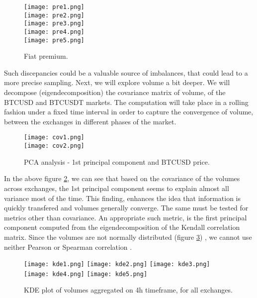 \begin{figure}[H]
	\centering
    \texttt{[image: pre1.png]} \\
    \texttt{[image: pre2.png]} \\
    \texttt{[image: pre3.png]} \\
    \texttt{[image: pre4.png]} \\
    \texttt{[image: pre5.png]} \\
	\caption{Fiat premium.}
    \label{fig:premium}
\end{figure}


Such discepancies could be a valuable source of imbalances, that could lead to a more precise sampling. Next, we will explore volume a bit deeper. We will decompose (eigendecomposition) the covariance matrix of volume, of the BTCUSD and BTCUSDT markets. The computation will take place in a rolling fashion under a fixed time interval in order to capture the convergence of volume, between the exchanges in different phases of the market.


\begin{figure}[H]
	\centering
    \texttt{[image: cov1.png]} \\
    \texttt{[image: cov2.png]} \\
	\caption{PCA analysis - 1st principal component and BTCUSD price.}
    \label{fig:covmatrix}
\end{figure}

In the above figure \ref{fig:covmatrix}, we can see that based on the covariance of the volumes across exchanges, the 1st principal component seems to explain almost all variance most of the time. This finding, enhances the idea that information is quickly transfered and volumes generally converge. The same must be tested for metrics other than covariance. An appropriate such metric, is the first principal component computed from the eigendecomposition of the Kendall correlation matrix. Since the volumes are not normally distributed (figure \ref{fig:kdevol}) , we cannot use neither Pearson or Spearman correlation .


\begin{figure}[H]
	\centering
    \texttt{[image: kde1.png]}
    \texttt{[image: kde2.png]}
    \texttt{[image: kde3.png]}
    \texttt{[image: kde4.png]}
    \texttt{[image: kde5.png]}
	\caption{KDE plot of volumes aggregated on 4h timeframe, for all exchanges.}
    \label{fig:kdevol}
\end{figure}


